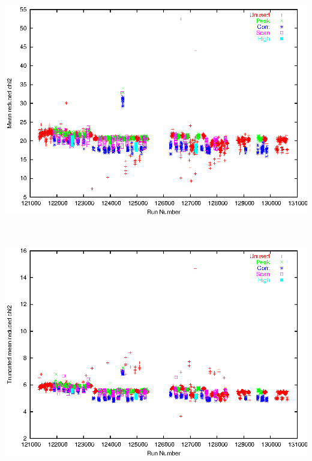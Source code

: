 \documentclass[12pt]{article}
\begin{document}
\mbox{ }

\vfill
\includegraphics[height=0.9\linewidth, angle=90]{meanredchi.eps}

\vfill
\pagebreak

\mbox{ }

\vfill
\includegraphics[height=0.9\linewidth, angle=90]{meancutredchi.eps}

\vfill
\pagebreak
\end{document}
